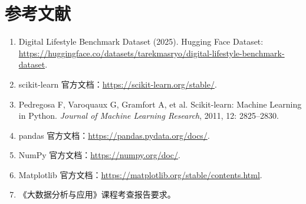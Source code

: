 \chapter*{参考文献}

\begin{enumerate}
  \item Digital Lifestyle Benchmark Dataset (2025). Hugging Face Dataset: \url{https://huggingface.co/datasets/tarekmasryo/digital-lifestyle-benchmark-dataset}.
  \item scikit-learn 官方文档：\url{https://scikit-learn.org/stable/}.
  \item Pedregosa F, Varoquaux G, Gramfort A, et al. Scikit-learn: Machine Learning in Python. \textit{Journal of Machine Learning Research}, 2011, 12: 2825--2830.
  \item pandas 官方文档：\url{https://pandas.pydata.org/docs/}.
  \item NumPy 官方文档：\url{https://numpy.org/doc/}.
  \item Matplotlib 官方文档：\url{https://matplotlib.org/stable/contents.html}.
  \item 《大数据分析与应用》课程考查报告要求。
\end{enumerate}
